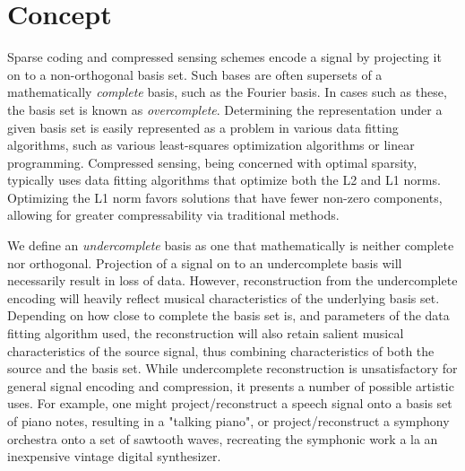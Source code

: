 \documentclass[twoside,a4paper]{article}
\title{\papertitle}
\affiliation{
\paperauthorA}
{\href{https://ccrma.stanford.edu/}{Center for Computer Research in Music and Acoustics} \\ Stanford University\\ Stanford, California \\
{\tt \href{mailto:spencer@ccrma.stanford.edu}{spencer@ccrma.stanford.edu}}
}
\newif\ifpdf
\begin{document}
\ifpdf %
  \DeclareGraphicsExtensions{.png,.jpg,.pdf}
\else  %
\fi

\maketitle

\begin{abstract}
Sparse coding and compressed sensing techniques have found a variety of uses in efficient signal encoding and compression. 
However these efforts typically seek to reconstruct a given signal with high-fidelity, and in the ideal case, with little to no perceptual variation from the original signal. 
In this project, we extended techniques for optimal L2+L1 norm sparse coding to retain characteristics of both the encoding basis set and the original input signals, for use as an effect in creative music applications. 
In this way, source signals can seem to be "recreated" or "remixed" by a different set of musical primitives, e.g. a symphony orchestra recreated by a 1980s video game console. 
\end{abstract}

\section{Concept}

Sparse coding and compressed sensing schemes encode a signal by projecting it on to a non-orthogonal basis set. 
Such bases are often supersets of a mathematically \emph{complete} basis, such as the Fourier basis. 
In cases such as these, the basis set is known as \emph{overcomplete}. 
Determining the representation under a given basis set is easily represented as a problem in various data fitting algorithms, such as various least-squares optimization algorithms or linear programming. 
Compressed sensing, being concerned with optimal sparsity, typically uses data fitting algorithms that optimize both the L2 and L1 norms. 
Optimizing the L1 norm favors solutions that have fewer non-zero components, allowing for greater compressability via traditional methods. 

We define an \emph{undercomplete} basis as one that mathematically is neither complete nor orthogonal. 
Projection of a signal on to an undercomplete basis will necessarily result in loss of data. 
However, reconstruction from the undercomplete encoding will heavily reflect musical characteristics of the underlying basis set. 
Depending on how close to complete the basis set is, and parameters of the data fitting algorithm used, the reconstruction will also retain salient musical characteristics of the source signal, thus combining characteristics of both the source and the basis set. 
While undercomplete reconstruction is unsatisfactory for general signal encoding and compression, it presents a number of possible artistic uses. 
For example, one might project/reconstruct a speech signal onto a basis set of piano notes, resulting in a "talking piano", or project/reconstruct a symphony orchestra onto a set of sawtooth waves, recreating the symphonic work a la an inexpensive vintage digital synthesizer. 
\end{document}
